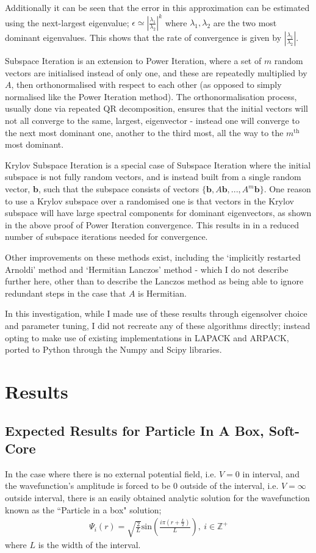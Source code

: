 Additionally it can be seen that the error in this approximation can be estimated using the next-largest eigenvalue; $\epsilon \simeq |\frac{\lambda_1}{\lambda_2}|^{k}$ where $\lambda_1, \lambda_2$ are the two most dominant eigenvalues. This shows that the rate of convergence is given by $|\frac{\lambda_1}{\lambda_2}|$.


Subspace Iteration is an extension to Power Iteration, where a set of $m$ random vectors are initialised instead of only one, and these are repeatedly multiplied by $A$, then orthonormalised with respect to each other (as opposed to simply normalised like the Power Iteration method). The orthonormalisation process, usually done via repeated QR decomposition, ensures that the initial vectors will not all converge to the same, largest, eigenvector - instead one will converge to the next most dominant one, another to the third most, all the way to the $m^{\text{th}}$ most dominant.


Krylov Subspace Iteration is a special case of Subspace Iteration where the initial subspace is not fully random vectors, and is instead built from a single random vector, $\mathbf{b}$, such that the subspace consists of vectors $\{\mathbf{b}, A\mathbf{b},...,A^{m}\mathbf{b}\}$. One reason to use a Krylov subspace over a randomised one is that vectors in the Krylov subspace will have large spectral components for dominant eigenvectors, as shown in the above proof of Power Iteration convergence. This results in in a reduced number of subspace iterations needed for convergence.


Other improvements on these methods exist, including the `implicitly restarted Arnoldi' method and `Hermitian Lanczos' method - which I do not describe further here, other than to describe the Lanczos method as being able to ignore redundant steps in the case that $A$ is Hermitian.


In this investigation, while I made use of these results through eigensolver choice and parameter tuning, I did not recreate any of these algorithms directly; instead opting to make use of existing implementations in LAPACK and ARPACK, ported to Python through the Numpy and Scipy libraries.

\section{Results}
\subsection{Expected Results for Particle In A Box, Soft-Core}
In the case where there is no external potential field, i.e. $V=0$ in interval, and the wavefunction's amplitude is forced to be $0$ outside of the interval, i.e. $V=\infty$ outside interval, there is an easily obtained analytic solution for the wavefunction known as the ``Particle in a box" solution\cite{HyperPhysics}; 
\begin{align*}
	\Psi_{i}\left(r\right) = \sqrt{\frac{2}{L}}\text{sin}\left(\frac{i\pi \left(r + \frac{L}{2}\right)}{L}\right),\ i\in \mathbb{Z}^{+}
\end{align*}
where $L$ is the width of the interval.

